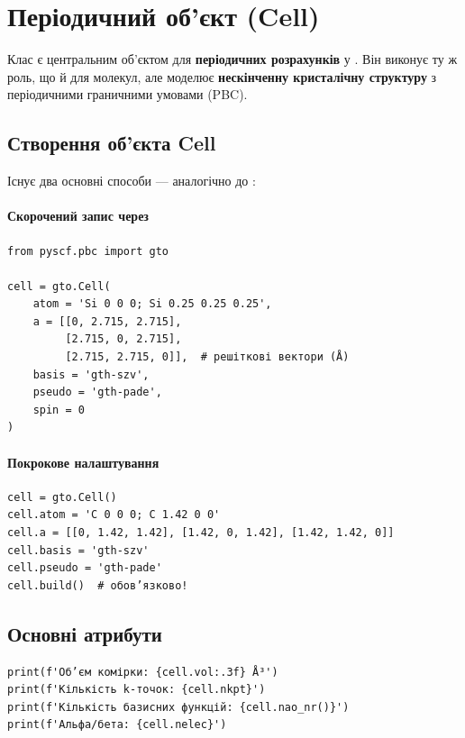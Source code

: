 \section{Періодичний об'єкт (Cell)}

Клас  є центральним об’єктом для \textbf{періодичних розрахунків} у \PySCF.
Він виконує ту ж роль, що й  для молекул, але моделює \textbf{нескінченну кристалічну структуру} з періодичними граничними умовами (PBC).

\subsection{Створення об'єкта Cell}

Існує два основні способи --- аналогічно до :

\paragraph{Скорочений запис через }

\begin{verbatim}
from pyscf.pbc import gto

cell = gto.Cell(
    atom = 'Si 0 0 0; Si 0.25 0.25 0.25',
    a = [[0, 2.715, 2.715],
         [2.715, 0, 2.715],
         [2.715, 2.715, 0]],  # решіткові вектори (Å)
    basis = 'gth-szv',
    pseudo = 'gth-pade',
    spin = 0
)
\end{verbatim}

\paragraph{Покрокове налаштування}

\begin{verbatim}
cell = gto.Cell()
cell.atom = 'C 0 0 0; C 1.42 0 0'
cell.a = [[0, 1.42, 1.42], [1.42, 0, 1.42], [1.42, 1.42, 0]]
cell.basis = 'gth-szv'
cell.pseudo = 'gth-pade'
cell.build()  # обов’язково!
\end{verbatim}

\subsection{Основні атрибути}

\begin{verbatim}
print(f'Об’єм комірки: {cell.vol:.3f} Å³')
print(f'Кількість k-точок: {cell.nkpt}')
print(f'Кількість базисних функцій: {cell.nao_nr()}')
print(f'Альфа/бета: {cell.nelec}')
\end{verbatim}

